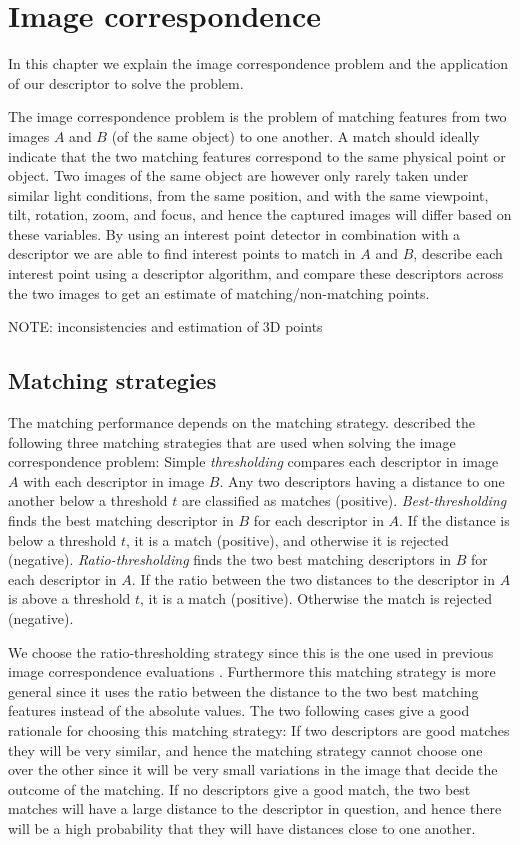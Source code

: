 \documentclass[thesis.tex]{subfiles}
\begin{document}
\chapter{Image correspondence}

In this chapter we explain the image correspondence problem and the application of our descriptor to solve the problem.

The image correspondence problem is the problem of matching features from two images $A$ and $B$ (of the same object) to one another. A match should ideally indicate that the two matching features correspond to the same physical point or object. Two images of the same object are however only rarely taken under similar light conditions, from the same position, and with the same viewpoint, tilt, rotation, zoom, and focus, and hence the captured images will differ based on these variables. By using an interest point detector in combination with a descriptor we are able to find interest points to match in $A$ and $B$, describe each interest point using a descriptor algorithm, and compare these descriptors across the two images to get an estimate of matching/non-matching points.

NOTE: inconsistencies and estimation of 3D points

\section{Matching strategies}
\label{sec:matching_strategies}

The matching performance depends on the matching strategy. \citet{mikolajczyk2005performance} described the following three matching strategies that are used when solving the image correspondence problem:
Simple \emph{thresholding} compares each descriptor in image $A$ with each descriptor in image $B$. Any two descriptors having a distance to one another below a threshold $t$ are classified as matches (positive). \emph{Best-thresholding} finds the best matching descriptor in $B$ for each descriptor in $A$. If the distance is below a threshold $t$, it is a match (positive), and otherwise it is rejected (negative). \emph{Ratio-thresholding} finds the two best matching descriptors in $B$ for each descriptor in $A$. If the ratio between the two distances to the descriptor in $A$ is above a threshold $t$, it is a match (positive). Otherwise the match is rejected (negative).

We choose the ratio-thresholding strategy since this is the one used in previous image correspondence evaluations \cite{mikolajczyk2005performance,dahl2011finding,larsen2012jet}. Furthermore this matching strategy is more general since it uses the ratio between the distance to the two best matching features instead of the absolute values. The two following cases give a good rationale for choosing this matching strategy: If two descriptors are good matches they will be very similar, and hence the matching strategy cannot choose one over the other since it will be very small variations in the image that decide the outcome of the matching. If no descriptors give a good match, the two best matches will have a large distance to the descriptor in question, and hence there will be a high probability that they will have distances close to one another.
\end{document}
